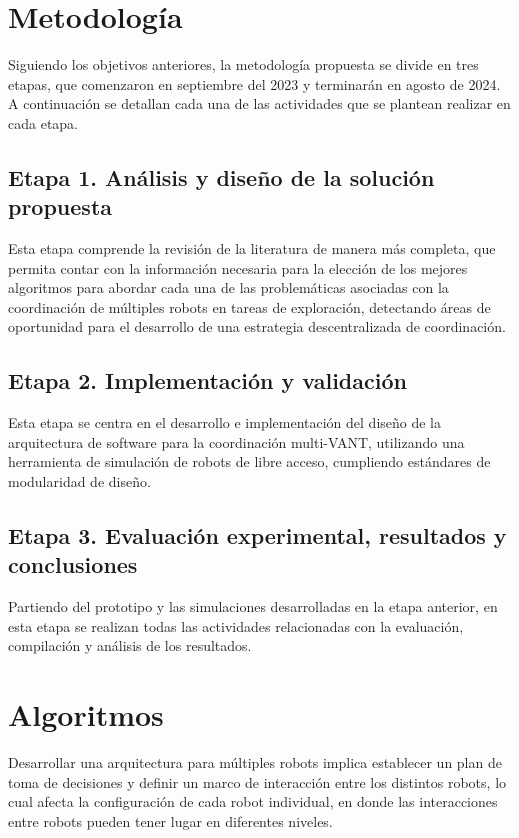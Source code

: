 \documentclass[sigconf]{acmart}
\begin{document}
\section{Metodología}

Siguiendo los objetivos anteriores, la metodolog\'{i}a propuesta se divide en tres etapas, que comenzaron en septiembre del 2023 y terminarán en agosto de 2024. A continuaci\'{o}n se detallan cada una de las actividades que se plantean realizar en cada etapa.

\subsection*{Etapa 1. An\'{a}lisis y dise\~{n}o de la soluci\'{o}n propuesta}

Esta etapa comprende la revisi\'{o}n de la literatura de manera m\'{a}s completa, que permita contar con la informaci\'{o}n necesaria para la elecci\'{o}n de los mejores algoritmos para abordar cada una de las problem\'{a}ticas asociadas con la coordinaci\'{o}n de múltiples robots en tareas de exploración, detectando áreas de oportunidad para el desarrollo de una estrategia descentralizada de coordinación. 

\subsection*{Etapa 2. Implementaci\'{o}n y validaci\'{o}n}
  
  Esta etapa se centra en el desarrollo e implementaci\'{o}n del dise\~{n}o de la arquitectura de software para la coordinaci\'{o}n multi-VANT, utilizando una herramienta de simulación de robots de libre acceso, cumpliendo estándares de modularidad de diseño.
  
  \subsection*{Etapa 3. Evaluaci\'{o}n experimental, resultados y conclusiones}
  
  Partiendo del prototipo y las simulaciones desarrolladas en la etapa anterior, en esta etapa se realizan todas las actividades relacionadas con la evaluación, compilación y análisis de los resultados.
  
  
\section{Algoritmos}

Desarrollar una arquitectura para múltiples robots implica establecer un plan de toma de decisiones y definir un marco de interacción entre los distintos robots, lo cual afecta la configuración de cada robot individual, en donde las interacciones entre robots pueden tener lugar en diferentes niveles.\\
\end{document}

